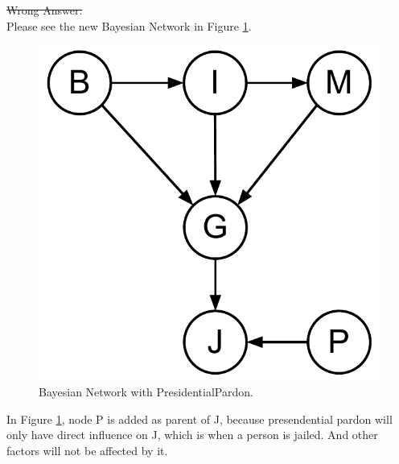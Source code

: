 \documentclass{article}
\begin{document}
\begin{enumerate}[a.]
{\sout{Wrong Answer: \\} 
  Please see the new Bayesian Network in Figure \ref{fig:14_14}.
  \begin{figure}[ht]
    \centering
    \includegraphics[width=.3\textwidth]{AI-HWK-2_14_14.pdf}
    \caption{Bayesian Network with PresidentialPardon.}\label{fig:14_14}
  \end{figure}
  In Figure \ref{fig:14_14}, node P is added as parent of J, because
  presendential pardon will only have direct influence on J, which is
  when a person is jailed. And other factors will not be affected by
  it. }
\end{enumerate}
\end{document}
